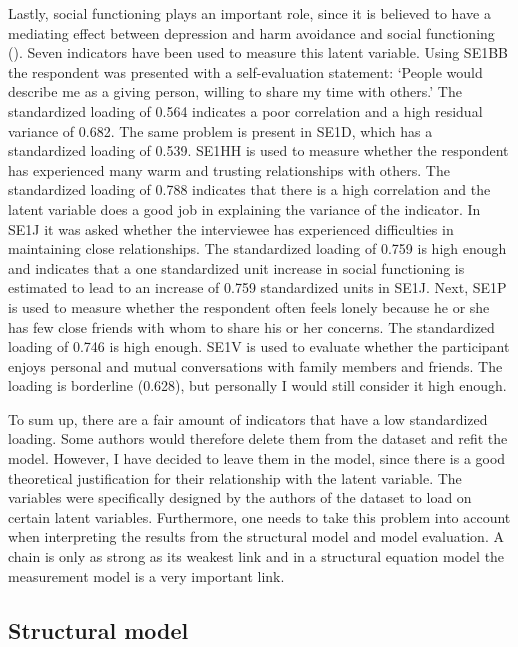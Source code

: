 \documentclass[11pt]{article}
\begin{document}
Lastly, social functioning plays an important role, since it is believed to have
a mediating effect between depression and harm avoidance and social functioning
(\cite{tse2011}). Seven indicators have been used to measure this latent
variable. Using SE1BB the respondent was presented with a self-evaluation
statement: `People would describe me as a giving person, willing to share my
time with others.' The standardized loading of 0.564 indicates a poor
correlation and a high residual variance of 0.682. The same problem is present
in SE1D, which has a standardized loading of 0.539. SE1HH is used to measure
whether the respondent has experienced many warm and trusting relationships with
others. The standardized loading of 0.788 indicates that there is a high
correlation and the latent variable does a good job in explaining the variance of the
indicator. In SE1J it was asked whether the interviewee has experienced
difficulties in maintaining close relationships. The standardized loading of
0.759 is high enough and indicates that a one standardized unit increase in
social functioning is estimated to lead to an increase of 0.759 standardized
units in SE1J. Next, SE1P is used to measure whether the respondent often feels
lonely because he or she has few close friends with whom to share his or her
concerns. The standardized loading of 0.746 is high enough. SE1V is used to
evaluate whether the participant enjoys personal and mutual conversations with
family members and friends. The loading is borderline (0.628), but personally
I would still consider it high enough.

To sum up, there are a fair amount of indicators that have a low standardized
loading. Some authors would therefore delete them from the dataset and refit the
model. However, I have decided to leave them in the model, since there is a good
theoretical justification for their relationship with the latent variable. The
variables were specifically designed by the authors of the dataset to load on
certain latent variables. Furthermore, one needs to take this problem into
account when interpreting the results from the structural model and model
evaluation. A chain is only as strong as its weakest link and in a structural
equation model the measurement model is a very important link.

\FloatBarrier
\subsection{Structural model}
\end{document}
